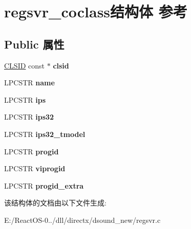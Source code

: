 \hypertarget{structregsvr__coclass}{}\section{regsvr\+\_\+coclass结构体 参考}
\label{structregsvr__coclass}
\subsection*{Public 属性}
\begin{DoxyCompactItemize}
\item 
\mbox{\label{structregsvr__coclass_a9f1a7baa49fa9ec5e9de90b3f1fa0051}} 
\hyperlink{struct___i_i_d}{C\+L\+S\+ID} const  $\ast$ {\bfseries clsid}
\item 
\mbox{\label{structregsvr__coclass_a9d0379df1656a81cbd68d4e74855e77c}} 
L\+P\+C\+S\+TR {\bfseries name}
\item 
\mbox{\label{structregsvr__coclass_a51b67704c8afa23482c86746b75c4fac}} 
L\+P\+C\+S\+TR {\bfseries ips}
\item 
\mbox{\label{structregsvr__coclass_af19a8afc8b3af6b173063e36c08d9d61}} 
L\+P\+C\+S\+TR {\bfseries ips32}
\item 
\mbox{\label{structregsvr__coclass_a05928c291dafce027ae9c1f6c75c388c}} 
L\+P\+C\+S\+TR {\bfseries ips32\+\_\+tmodel}
\item 
\mbox{\label{structregsvr__coclass_a946e396cc7fc95d19038a95106926d50}} 
L\+P\+C\+S\+TR {\bfseries progid}
\item 
\mbox{\label{structregsvr__coclass_ad3d2f46e6934d65a1171288c7ba89780}} 
L\+P\+C\+S\+TR {\bfseries viprogid}
\item 
\mbox{\label{structregsvr__coclass_aa6182833fabfef7cb1bf3a700bc0f188}} 
L\+P\+C\+S\+TR {\bfseries progid\+\_\+extra}
\end{DoxyCompactItemize}


该结构体的文档由以下文件生成\+:\begin{DoxyCompactItemize}
\item 
E\+:/\+React\+O\+S-\/0../dll/directx/dsound\+\_\+new/regsvr.\+c\end{DoxyCompactItemize}

